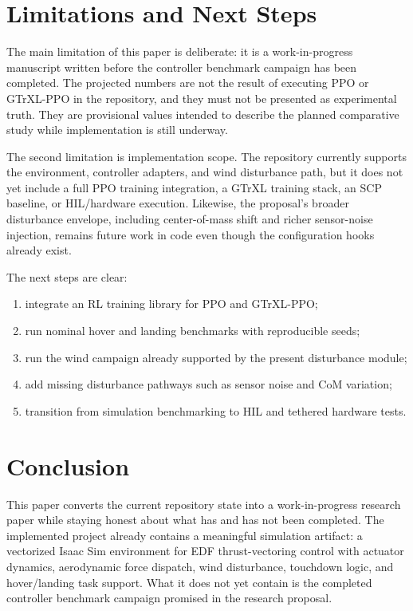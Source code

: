 \documentclass[10pt,twocolumn]{article}
\begin{document}
\section{Limitations and Next Steps}

The main limitation of this paper is deliberate: it is a work-in-progress manuscript written before the controller benchmark campaign has been completed. The projected numbers are not the result of executing PPO or GTrXL-PPO in the repository, and they must not be presented as experimental truth. They are provisional values intended to describe the planned comparative study while implementation is still underway.

The second limitation is implementation scope. The repository currently supports the environment, controller adapters, and wind disturbance path, but it does not yet include a full PPO training integration, a GTrXL training stack, an SCP baseline, or HIL/hardware execution. Likewise, the proposal's broader disturbance envelope, including center-of-mass shift and richer sensor-noise injection, remains future work in code even though the configuration hooks already exist.

The next steps are clear:
\begin{enumerate}
    \item integrate an RL training library for PPO and GTrXL-PPO;
    \item run nominal hover and landing benchmarks with reproducible seeds;
    \item run the wind campaign already supported by the present disturbance module;
    \item add missing disturbance pathways such as sensor noise and CoM variation;
    \item transition from simulation benchmarking to HIL and tethered hardware tests.
\end{enumerate}

\section{Conclusion}

This paper converts the current repository state into a work-in-progress research paper while staying honest about what has and has not been completed. The implemented project already contains a meaningful simulation artifact: a vectorized Isaac Sim environment for EDF thrust-vectoring control with actuator dynamics, aerodynamic force dispatch, wind disturbance, touchdown logic, and hover/landing task support. What it does not yet contain is the completed controller benchmark campaign promised in the research proposal.
\end{document}
